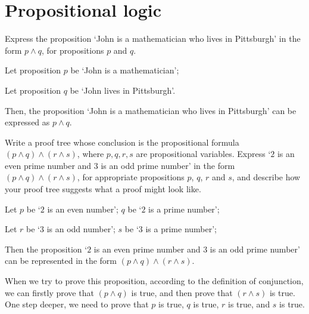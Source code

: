 \section{Propositional logic}

\begin{exercise}
\label{exJohnMathematicianPittsburgh}
Express the proposition `John is a mathematician who lives in Pittsburgh' in the form $p \wedge q$, for propositions $p$ and $q$.
\end{exercise}

\begin{solutions*}
    Let proposition $p$ be `John is a mathematician';

    Let proposition $q$ be `John lives in Pittsburgh'.
    
    Then, the proposition `John is a mathematician who lives in Pittsburgh' can be expressed as $p \wedge q$.
\end{solutions*}

\begin{exercise}
Write a proof tree whose conclusion is the propositional formula $(p \wedge q) \wedge (r \wedge s)$, where $p,q,r,s$ are propositional variables. Express `$2$ is an even prime number and $3$ is an odd prime number' in the form $(p \wedge q) \wedge (r \wedge s)$, for appropriate propositions $p$, $q$, $r$ and $s$, and describe how your proof tree suggests what a proof might look like.
\end{exercise}

\begin{solutions*}
     \fixlistskip
\begin{center}
    \begin{prooftree}
    \end{prooftree}
\end{center}
Let $p$ be `$2$ is an even number'; $q$ be `$2$ is a prime number';

Let $r$ be `$3$ is an odd number'; $s$ be `$3$ is a prime number';

Then the proposition `$2$ is an even prime number and $3$ is an odd prime number' can be represented in the form $(p \wedge q) \wedge (r \wedge s)$. 

When we try to prove this proposition, according to the definition of conjunction, we can firstly prove that $(p \wedge q)$ is true, and then prove that $(r \wedge s)$ is true. One step deeper, we need to prove that $p$ is true, $q$ is true, $r$ is true, and $s$ is true.

\end{solutions*}

